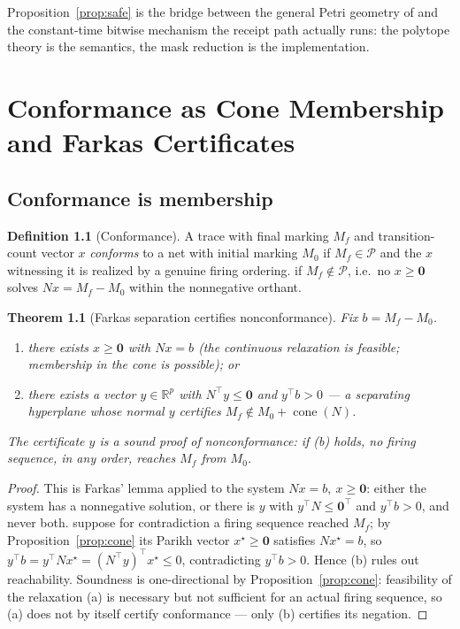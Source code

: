 \documentclass[11pt,oneside]{book}
\theoremstyle{definition}
\newtheorem{definition}{Definition}[chapter]
\theoremstyle{plain}
\newtheorem{theorem}{Theorem}[chapter]
\theoremstyle{remark}
\DeclareMathOperator{\cone}{cone}
\newcommand{\Poly}{\mathcal{P}}                %
\newcommand{\Nmat}{N}                 %
\begin{document}
Proposition~\ref{prop:safe} is the bridge between the general Petri geometry of
\cite{murata1989} and the constant-time bitwise mechanism the receipt path actually runs: the
polytope theory is the semantics, the mask reduction is the implementation.

\chapter{Conformance as Cone Membership and Farkas Certificates}
\label{ch:conformance}

\section{Conformance is membership}

\begin{definition}[Conformance]\label{def:conf}
A trace with final marking $M_f$ and transition-count vector $x$
\emph{conforms} to a net with initial marking $M_0$ if $M_f\in\Poly$ and the
$x$ witnessing it is realized by a genuine firing ordering.%
if $M_f\notin\Poly$, i.e.\ no $x\ge\bm 0$ solves
$\Nmat x=M_f-M_0$ within the nonnegative orthant.%
\end{definition}

\begin{theorem}[Farkas separation certifies nonconformance]\label{thm:farkas}
Fix $b=M_f-M_0$.%
\begin{enumerate}[label=(\alph*),leftmargin=*]
\item there exists $x\ge\bm 0$ with $\Nmat x=b$ (the continuous relaxation is
      feasible; membership in the cone is possible); or%
\item there exists a vector $y\in\mathbb{R}^{p}$ with $\Nmat^{\!\top}y\le\bm 0$ and
      $y^{\!\top}b>0$ --- a separating hyperplane whose normal $y$ certifies
      $M_f\notin M_0+\cone(\Nmat)$.%
\end{enumerate}
The certificate $y$ is a \emph{sound proof of nonconformance}: if (b) holds, no firing
sequence, in any order, reaches $M_f$ from $M_0$.%
\end{theorem}

\begin{proof}
This is Farkas' lemma \cite{schrijver1986} applied to the system $\Nmat x=b,\ x\ge\bm 0$: either the system has a nonnegative solution, or there is $y$ with
$y^{\!\top}\Nmat\le\bm 0^{\!\top}$ and $y^{\!\top}b>0$, and never both.%
suppose for contradiction a firing sequence reached $M_f$; by
Proposition~\ref{prop:cone} its Parikh vector $x^{\star}\ge\bm 0$ satisfies
$\Nmat x^{\star}=b$, so $y^{\!\top}b=y^{\!\top}\Nmat x^{\star}
=(\Nmat^{\!\top}y)^{\!\top}x^{\star}\le 0$, contradicting $y^{\!\top}b>0$.%
Hence (b) rules out reachability. Soundness is one-directional by
Proposition~\ref{prop:cone}: feasibility of the relaxation (a) is necessary but not
sufficient for an actual firing sequence, so (a) does not by itself certify conformance ---
only (b) certifies its negation. \end{proof}
\end{document}
